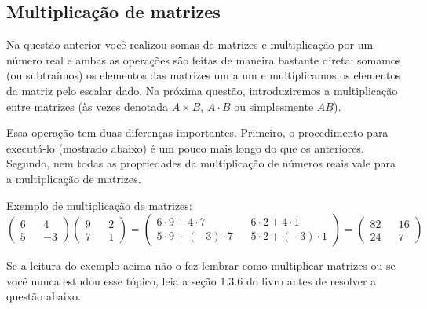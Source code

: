 \documentclass[main.tex]{subfiles}
\begin{document}
\subsection*{Multiplicação de matrizes}

Na questão anterior você realizou somas de matrizes e multiplicação por um número real e ambas as operações são feitas de maneira bastante direta: somamos (ou subtraímos) os elementos das matrizes um a um e multiplicamos os elementos da matriz pelo escalar dado. Na próxima questão, introduziremos a multiplicação entre matrizes (às vezes denotada $A \times B$, $A \cdot B$ ou simplesmente $AB$).

Essa operação tem duas diferenças importantes. Primeiro, o procedimento para executá-lo (mostrado abaixo) é um pouco mais longo do que os anteriores. Segundo, nem todas as propriedades da multiplicação de números reais vale para a multiplicação de matrizes.

\begin{caixaExemplo}
 \noindent  Exemplo de multiplicação de matrizes:
 $$ \begin{pmatrix} 6 && 4 \\ 5 && -3 \end{pmatrix} \begin{pmatrix} 9 && 2 \\ 7 && 1  \end{pmatrix} = \begin{pmatrix} 6 \cdot 9 + 4 \cdot 7 &&  6 \cdot2 + 4 \cdot 1 \\ 5 \cdot 9 + (-3) \cdot 7 && 5 \cdot 2 + (-3) \cdot 1 \end{pmatrix} = \begin{pmatrix} 82 &&  16 \\ 24 && 7 \end{pmatrix}$$
\end{caixaExemplo}

Se a leitura do exemplo acima não o fez lembrar como multiplicar matrizes ou se você nunca estudou esse tópico, leia a seção 1.3.6 do livro  antes de resolver a questão abaixo.
\end{document}
